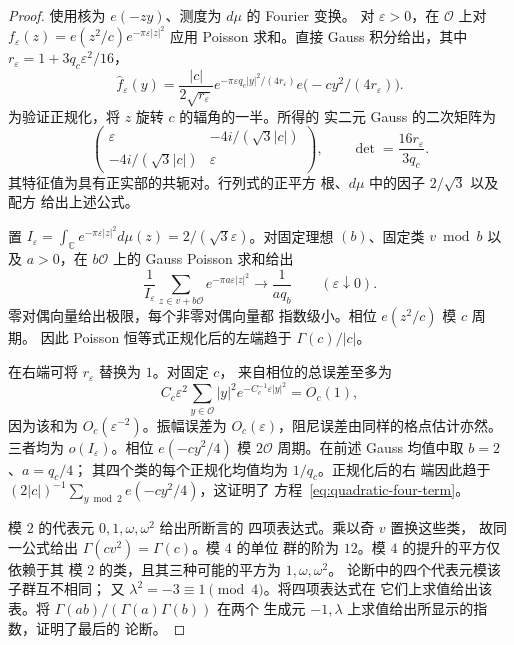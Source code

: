 \documentclass[11pt,a4paper]{article}
\numberwithin{equation}{section}
\numberwithin{figure}{section}
\theoremstyle{definition}
\theoremstyle{remark}
\begin{document}
\begin{proof}
使用核为 $e(-zy)$、测度为 $d\mu$ 的 Fourier 变换。
对 $\varepsilon>0$，在 $\mathcal O$ 上对
$f_\varepsilon(z)=e(z^2/c)e^{-\pi\varepsilon|z|^2}$ 应用 Poisson 求和。直接 Gauss
积分给出，其中 $r_\varepsilon=1+3q_c\varepsilon^2/16$，
\[
 \widehat f_\varepsilon(y)
 =\frac{|c|}{2\sqrt{r_\varepsilon}}
    e^{-\pi\varepsilon q_c|y|^2/(4r_\varepsilon)}
    e\bigl(-cy^2/(4r_\varepsilon)\bigr).
\]
为验证正规化，将 $z$ 旋转 $c$ 的辐角的一半。所得的
实二元 Gauss 的二次矩阵为
\[
 \begin{pmatrix}
 \varepsilon&-4i/(\sqrt3|c|)\\
 -4i/(\sqrt3|c|)&\varepsilon
 \end{pmatrix},
 \qquad \det=\frac{16r_\varepsilon}{3q_c}.
\]
其特征值为具有正实部的共轭对。行列式的正平方
根、$d\mu$ 中的因子 $2/\sqrt3$ 以及配方
给出上述公式。

置 $I_\varepsilon=\int_{\mathbb C}e^{-\pi\varepsilon|z|^2}d\mu(z)
=2/(\sqrt3\varepsilon)$。对固定理想 $(b)$、固定类 $v\bmod b$
以及 $a>0$，在 $b\mathcal O$ 上的 Gauss Poisson 求和给出
\[
 \frac1{I_\varepsilon}\sum_{z\in v+b\mathcal O}
             e^{-\pi a\varepsilon|z|^2}
 \longrightarrow\frac1{a q_b}\qquad(\varepsilon\downarrow0).
\]
零对偶向量给出极限，每个非零对偶向量都
指数级小。相位 $e(z^2/c)$ 模 $c$ 周期。
因此 Poisson 恒等式正规化后的左端趋于
$\Gamma(c)/|c|$。

在右端可将 $r_\varepsilon$ 替换为 $1$。对固定 $c$，
来自相位的总误差至多为
\[
 C_c\varepsilon^2\sum_{y\in\mathcal O}|y|^2
                         e^{-C_c^{-1}\varepsilon|y|^2}=O_c(1),
\]
因为该和为 $O_c(\varepsilon^{-2})$。振幅误差为
$O_c(\varepsilon)$，阻尼误差由同样的格点估计亦然。
三者均为 $o(I_\varepsilon)$。相位 $e(-cy^2/4)$ 模
$2\mathcal O$ 周期。在前述 Gauss 均值中取 $b=2$、$a=q_c/4$；
其四个类的每个正规化均值均为 $1/q_c$。正规化后的右
端因此趋于 $(2|c|)^{-1}\sum_{y\bmod2}e(-cy^2/4)$，这证明了
方程~\eqref{eq:quadratic-four-term}。

模 $2$ 的代表元 $0,1,\omega,\omega^2$ 给出所断言的
四项表达式。乘以奇 $v$ 置换这些类，
故同一公式给出 $\Gamma(cv^2)=\Gamma(c)$。模 $4$ 的单位
群的阶为 $12$。模 $4$ 的提升的平方仅依赖于其
模 $2$ 的类，且其三种可能的平方为 $1,\omega,\omega^2$。
论断中的四个代表元模该子群互不相同；
又 $\lambda^2=-3\equiv1\pmod4$。将四项表达式在
它们上求值给出该表。将 $\Gamma(ab)/(\Gamma(a)\Gamma(b))$ 在两个
生成元 $-1,\lambda$ 上求值给出所显示的指数，证明了最后的
论断。
\end{proof}
\end{document}
